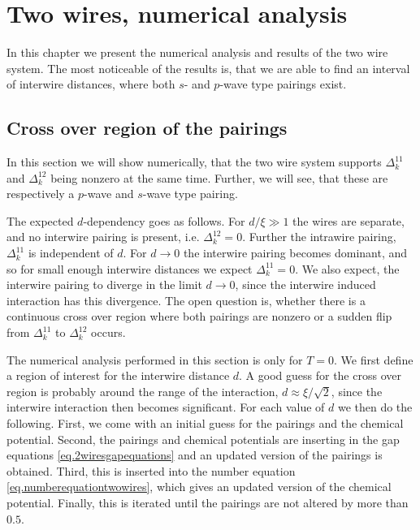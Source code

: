 
\chapter{Two wires, numerical analysis} %

\label{Chapter10} %


In this chapter we present the numerical analysis and results of the two wire system. The most noticeable of the results is, that we are able to find an interval of interwire distances, where both $s$- and $p$-wave type pairings exist. 

\section{Cross over region of the pairings}
In this section we will show numerically, that the two wire system supports $\Delta^{11}_k$ and $\Delta^{12}_k$ being nonzero at the same time. Further, we will see, that these are respectively a $p$-wave and $s$-wave type pairing. 

The expected $d$-dependency goes as follows. For $d/\xi \gg 1$ the wires are separate, and no interwire pairing is present, i.e. $\Delta^{12}_k = 0$. Further the intrawire pairing, $\Delta^{11}_k$ is independent of $d$. For $d\to 0$ the interwire pairing becomes dominant, and so for small enough interwire distances we expect $\Delta^{11}_k = 0$. We also expect, the interwire pairing to diverge in the limit $d\to 0$, since the interwire induced interaction has this divergence. The open question is, whether there is a continuous cross over region where both pairings are nonzero or a sudden flip from $\Delta^{11}_k$ to $\Delta^{12}_k$ occurs. 

The numerical analysis performed in this section is only for $T = 0$. We first define a region of interest for the interwire distance $d$. A good guess for the cross over region is probably around the range of the interaction, $d \approx \xi/\sqrt{2}$, since the interwire interaction then becomes significant. For each value of $d$ we then do the following. First, we come with an initial guess for the pairings and the chemical potential. Second, the pairings and chemical potentials are inserting in the gap equations \ref{eq.2wiresgapequations} and an updated version of the pairings is obtained. Third, this is inserted into the number equation \ref{eq.numberequationtwowires}, which gives an updated version of the chemical potential. Finally, this is iterated until the pairings are not altered by more than $0.5$\textperthousand. 

